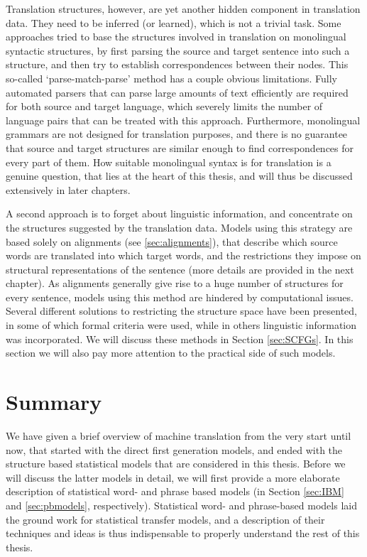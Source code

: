 Translation structures, however, are yet another hidden component in translation data. They need to be inferred (or learned), which is not a trivial task. Some approaches tried to base the structures involved in translation on monolingual syntactic structures, by first parsing the source and target sentence into such a structure, and then try to establish correspondences between their nodes. This so-called `parse-match-parse' method has a couple obvious limitations. Fully automated parsers that can parse large amounts of text efficiently are required for both source and target language, which severely limits the number of language pairs that can be treated with this approach. Furthermore, monolingual grammars are not designed for translation purposes, and there is no guarantee that source and target structures are similar enough to find correspondences for every part of them. How suitable monolingual syntax is for translation is a genuine question, that lies at the heart of this thesis, and will thus be discussed extensively in later chapters.

A second approach is to forget about linguistic information, and concentrate on the structures suggested by the translation data. Models using this strategy are based solely on alignments (see \ref{sec:alignments}), that describe which source words are translated into which target words, and the restrictions they impose on structural representations of the sentence (more details are provided in the next chapter). As alignments generally give rise to a huge number of structures for every sentence, models using this method are hindered by computational issues. Several different solutions to restricting the structure space have been presented, in some of which formal criteria were used, while in others linguistic information was incorporated. We will discuss these methods in Section \ref{sec:SCFGs}. In this section we will also pay more attention to the practical side of such models.

\section*{Summary}
We have given a brief overview of machine translation from the very start until now, that started with the direct first generation models, and ended with the structure based statistical models that are considered in this thesis. Before we will discuss the latter models in detail, we will first provide a more elaborate description of statistical word- and phrase based models (in Section \ref{sec:IBM} and \ref{sec:pbmodels}, respectively). Statistical word- and phrase-based models laid the ground work for statistical transfer models, and a description of their techniques and ideas is thus indispensable to properly understand the rest of this thesis.

